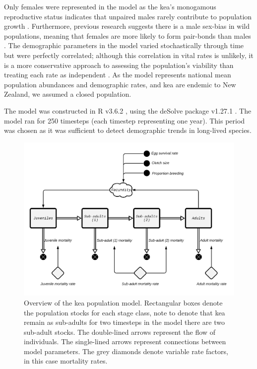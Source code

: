 \documentclass[11pt,]{article}
\begin{document}
Only females were represented in the model as the kea's monogamous
reproductive status indicates that unpaired males rarely contribute to
population growth \citep{bond1991, ferson1995}. Furthermore, previous
research suggests there is a male sex-bias in wild populations, meaning
that females are more likely to form pair-bonds than males
\citep{bond1991, bond1992}. The demographic parameters in the model
varied stochastically through time but were perfectly correlated;
although this correlation in vital rates is unlikely, it is a more
conservative approach to assessing the population's viability than
treating each rate as independent \citep{ellner2002, ferson1995}. As the
model represents national mean population abundances and demographic
rates, and kea are endemic to New Zealand, we assumed a closed
population.

The model was constructed in R v3.6.2 \citep{R2020}, using the deSolve
package v1.27.1 \citep{soetaert2010}. The model ran for 250 timesteps
(each timestep representing one year). This period was chosen as it was
sufficient to detect demographic trends in long-lived species.

\begin{figure}
\centering
\includegraphics{Figures/Kea_model.png}
\caption{Overview of the kea population model. Rectangular boxes denote
the population stocks for each stage class, note to denote that kea
remain as sub-adults for two timesteps in the model there are two
sub-adult stocks. The double-lined arrows represent the flow of
individuals. The single-lined arrows represent connections between model
parameters. The grey diamonds denote variable rate factors, in this case
mortality rates.}
\end{figure}
\end{document}
